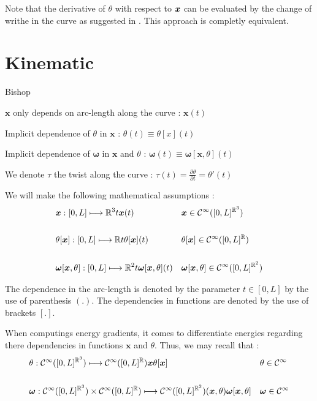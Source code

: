 Note that the derivative of $\theta$ with respect to $\boldsymbol{x}$ can be evaluated by the change of writhe in the curve as suggested in \cite{deVries2005}. This approach is completly equivalent.


\section{Kinematic}

Bishop

 $\boldsymbol{x}$ only depends on arc-length along the curve : $\boldsymbol{x}(t)$

Implicit dependence of $\theta$ in $\boldsymbol{x}$ : $\theta(t) \equiv \theta[x](t)$

Implicit dependence of $\boldsymbol{\omega}$ in $\boldsymbol{x}$ and $\theta$ : $\boldsymbol{\omega}(t) \equiv \boldsymbol{\omega}[\boldsymbol{x},\theta](t)$

We denote $\tau$ the twist along the curve : $\tau(t) = \frac{\partial \theta}{\partial t} = \theta'(t)$

We will make the following mathematical assumptions :
\begin{align}
	&\boldsymbol{x} : [0,L] \longmapsto \mathbb{R}^3{t}{\boldsymbol{x}(t)}
	&&\boldsymbol{x} \in \mathcal{C}^{\infty}([0,L]^{\mathbb{R}^3})
	\\ \notag\\
	&\theta[\boldsymbol{x}] : [0,L] \longmapsto \mathbb{R}{t}{\theta[\boldsymbol{x}](t)}
	&&\theta[\boldsymbol{x}] \in \mathcal{C}^{\infty}([0,L]^{\mathbb{R}})
	\\ \notag\\
	&\boldsymbol{\omega}[\boldsymbol{x},\theta] : [0,L] \longmapsto \mathbb{R}^2{t}{\boldsymbol{\omega}[\boldsymbol{x},\theta](t)}
	&&\boldsymbol{\omega}[\boldsymbol{x},\theta] \in \mathcal{C}^{\infty}([0,L]^{\mathbb{R}^2})
\end{align}

The dependence in the arc-length is denoted by the parameter $t \in [0,L]$ by the use of parenthesis $(.)$.
The dependencies in functions are denoted by the use of brackets $[.]$.

When computings energy gradients, it comes to differentiate energies regarding there dependencies in functions $\boldsymbol{x}$ and $\theta$. Thus, we may recall that :
\begin{align}
	&\theta : \mathcal{C}^{\infty}([0,L]^{\mathbb{R}^3}) \longmapsto \mathcal{C}^{\infty}([0,L]^\mathbb{R}){\boldsymbol{x}}{\theta[\boldsymbol{x}]}
	&&\theta \in \mathcal{C}^{\infty}
	\\ \notag\\
	&\boldsymbol{\omega} : \mathcal{C}^{\infty}([0,L]^{\mathbb{R}^3}) \times \mathcal{C}^{\infty}([0,L]^{\mathbb{R}}) \longmapsto \mathcal{C}^{\infty}([0,L]^{\mathbb{R}^2}){(\boldsymbol{x},\theta)}{\boldsymbol{\omega}[\boldsymbol{x},\theta]}
	&&\boldsymbol{\omega} \in \mathcal{C}^{\infty}
\end{align}





